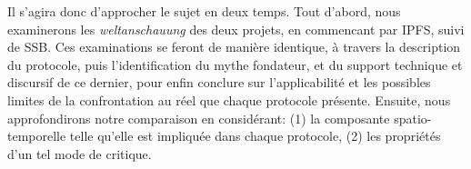 \documentclass{article}
\begin{document}
Il s'agira donc d'approcher le sujet en deux temps. Tout d'abord, nous examinerons les \emph{weltanschauung} des deux projets, en commencant par IPFS, suivi de SSB. Ces examinations se feront de manière identique, à travers la description du protocole, puis l'identification du mythe fondateur, et du support technique et discursif de ce dernier, pour enfin conclure sur l'applicabilité et les possibles limites de la confrontation au réel que chaque protocole présente. Ensuite, nous approfondirons notre comparaison en considérant: (1) la composante spatio-temporelle telle qu'elle est impliquée dans chaque protocole, (2) les propriétés d'un tel mode de critique.

\pagebreak



\end{document}
